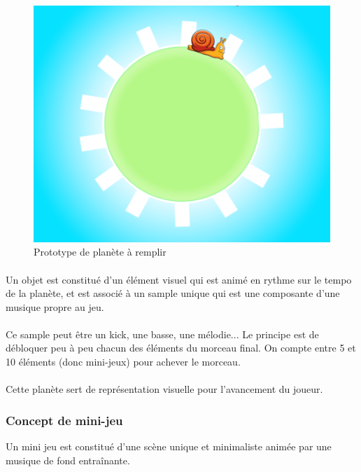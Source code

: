 \begin{figure}[H]\centering
  \includegraphics[scale=.4]{./img/protoPlanete.png}
  \caption{Prototype de planète à remplir}
  \label{protoPlanete}
\end{figure}

\paragraph{} Un objet est constitué d’un élément visuel qui est animé en rythme sur le tempo de la planète, et est associé à un sample unique qui est une composante d’une musique propre au jeu.\
\paragraph{}Ce sample peut être un kick, une basse, une mélodie... Le principe est de débloquer peu à peu chacun des éléments du morceau final. On compte entre 5 et 10 éléments (donc mini-jeux) pour achever le morceau.
\paragraph{}Cette planète sert de représentation visuelle pour l’avancement du joueur.

\subsubsection{Concept de mini-jeu}
Un mini jeu est constitué d’une scène unique et minimaliste animée par une musique de fond entraînante.

